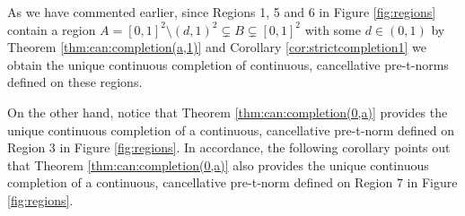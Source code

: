 As we have commented earlier, since Regions 1, 5 and 6 in Figure \ref{fig:regions} contain a region $A=[0,1]^2 \setminus (d,1)^2 \subsetneq B \subsetneq [0,1]^2$ with some $d \in (0,1)$ by Theorem \ref{thm:can:completion(a,1)} and Corollary \ref{cor:strictcompletion1} we obtain the unique continuous completion of continuous, cancellative pre-t-norms defined on these regions.

On the other hand, notice that Theorem \ref{thm:can:completion(0,a)} provides the unique continuous completion of a continuous, cancellative pre-t-norm defined on Region 3 in Figure \ref{fig:regions}. In accordance, the following corollary points out that Theorem \ref{thm:can:completion(0,a)} also provides the unique continuous completion of a continuous, cancellative pre-t-norm defined on Region 7 in Figure \ref{fig:regions}.

